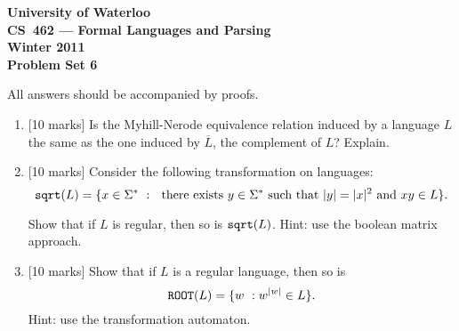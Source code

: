 \documentclass[12pt]{article}
\begin{document}
\begin{center}
\large\bf University of Waterloo\\
CS~462 --- Formal Languages and Parsing\\
Winter 2011\\
Problem Set 6\\
\end{center}

\bigskip


\smallskip


\bigskip\bigskip

All answers should be accompanied by proofs.

\begin{enumerate}

\item{} [10 marks]
Is the Myhill-Nerode equivalence relation induced by a language
$L$ the same as the one induced by $\overline{L}$, the complement of $L$?  
Explain.

\item{} [10 marks] 
Consider the following transformation on languages:
$$ {\tt sqrt} (L) = \lbrace x \in \Sigma^* \ : \ \text{ there exists }
y \in \Sigma^* \text{ such that } |y| = |x|^2 \text{ and } xy \in L
\rbrace.$$

Show that if $L$ is regular, then so is ${\tt sqrt}(L)$.  Hint:  use
the boolean matrix approach.

\item{} [10 marks]
Show that if $L$ is a regular language, then so is
$${\tt ROOT}(L) = \lbrace w \ : w^{|w|} \in L \rbrace.$$
Hint:  use the transformation automaton.

\end{enumerate}
\end{document}
